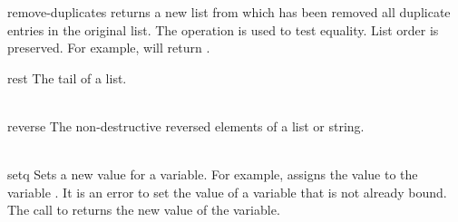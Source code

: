 \begin{okbcfspec}{remove-duplicates}
 returns a new list from
which has been removed all duplicate entries in the original
list.   The operation  is used to test
equality.
List order is preserved.
For example,
will return .
\end{okbcfspec}

\begin{okbcfspec}{rest}
The tail of a list.\\
\\
\end{okbcfspec}

\begin{okbcfspec}{reverse}
The non-destructive reversed elements of a list or string.\\
\\
\end{okbcfspec}

\begin{okbcfspec}{setq}
Sets a new value for a variable.  For
example,  assigns the value  to
the variable .  It is an error to set the value of
a variable that is not already bound.
The call to  returns the new value of the
variable.
\end{okbcfspec}

